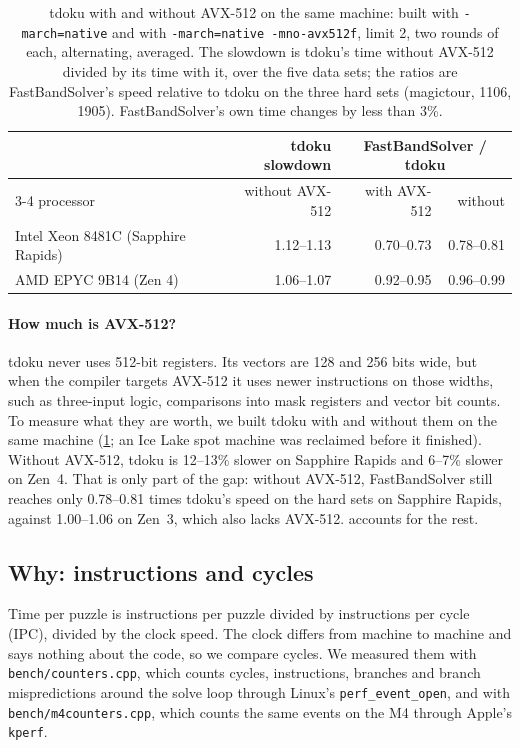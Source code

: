 \documentclass[11pt]{article}
\theoremstyle{definition}
\theoremstyle{plain}
\begin{document}
\begin{table}[t]
\centering
\caption{tdoku with and without AVX-512 on the same machine: built with \texttt{-march=native} and with
\texttt{-march=native -mno-avx512f}, limit 2, two rounds of each, alternating, averaged. The slowdown is tdoku's time
without AVX-512 divided by its time with it, over the five data sets; the ratios are FastBandSolver's speed relative
to tdoku on the three hard sets (magictour, 1106, 1905). FastBandSolver's own time changes by less than 3\%.}
\label{tab:avx512}
\small
\begin{tabular}{lrrr}
\toprule
& tdoku slowdown & \multicolumn{2}{c}{FastBandSolver / tdoku} \\
\cmidrule(lr){3-4}
processor & without AVX-512 & with AVX-512 & without \\
\midrule
Intel Xeon 8481C (Sapphire Rapids) & 1.12--1.13 & 0.70--0.73 & 0.78--0.81 \\
AMD EPYC 9B14 (Zen 4) & 1.06--1.07 & 0.92--0.95 & 0.96--0.99 \\
\bottomrule
\end{tabular}
\end{table}

\paragraph{How much is AVX-512?} tdoku never uses 512-bit registers. Its vectors are 128 and 256 bits wide, but when
the compiler targets AVX-512 it uses newer instructions on those widths, such as three-input logic, comparisons into mask
registers and vector bit counts. To measure what
they are worth, we built tdoku with and without them on the same machine (\cref{tab:avx512}; an Ice Lake spot machine
was reclaimed before it finished). Without AVX-512, tdoku is 12--13\% slower on Sapphire Rapids and 6--7\% slower on
Zen~4. That is only part of the gap: without AVX-512, FastBandSolver still reaches only 0.78--0.81 times tdoku's speed
on the hard sets on Sapphire Rapids, against 1.00--1.06 on Zen~3, which also lacks AVX-512.  accounts for the rest.

\subsection{Why: instructions and cycles}
\label{sec:why}

Time per puzzle is instructions per puzzle divided by instructions per cycle (IPC), divided by the clock speed. The
clock differs from machine to machine and says nothing about the code, so we compare cycles. We measured them with
\texttt{bench/counters.cpp}, which counts cycles, instructions, branches and branch mispredictions around the solve
loop through Linux's \texttt{perf\_event\_open}, and with \texttt{bench/m4counters.cpp}, which counts the same events
on the M4 through Apple's \texttt{kperf}.
\end{document}
